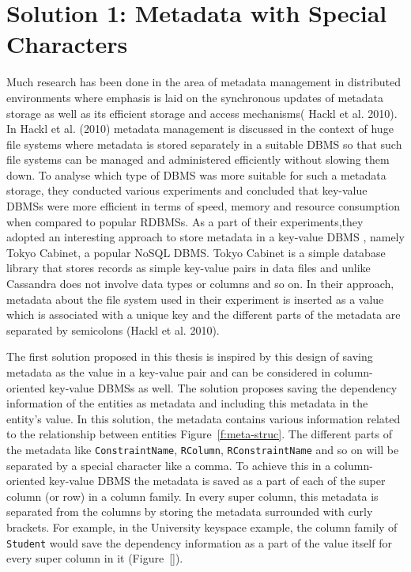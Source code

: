 \section{Solution 1:  Metadata with Special Characters}\label{s:sol1}
	Much research has been done in the area of  metadata management in distributed
	environments  where emphasis is laid on the synchronous updates of metadata
	storage as well as its efficient storage and access mechanisms(
	Hackl et al.  2010). 
	In Hackl et al.  (2010)  metadata management is discussed in the context of huge
	file systems where metadata is stored separately in a suitable \ac{DBMS} so
	that such file systems can be managed and administered efficiently without
	slowing them down.  To analyse which type of \ac{DBMS} was more suitable for such a
	metadata storage, they conducted various experiments and concluded that
	key-value \acp{DBMS} were more efficient in terms of speed, memory and resource
	consumption when compared to popular \acp{RDBMS}.  As a part of their
	experiments,they adopted an interesting approach to store metadata in a
	key-value \ac{DBMS} , namely Tokyo Cabinet, a popular \ac{NoSQL} \ac{DBMS}. Tokyo
	Cabinet is a simple database library that stores records as simple key-value
	pairs in data files and unlike Cassandra does not involve data types or columns
	and so on.  In their approach, metadata about the file system used in their
	experiment is inserted as a value which is associated with a unique key and the
	different parts of the metadata are separated by semicolons (Hackl et al.  2010). 
	
	The first solution proposed in this thesis is inspired by this design of saving
	metadata as the value in a key-value pair and can be considered in
	column-oriented key-value \acp{DBMS} as well. 
	The solution proposes saving the dependency information of the entities as
	metadata and including this metadata in the entity's value.  In this solution,
	the metadata contains  various information related to the relationship between
	entities Figure~\ref{f:meta-struc}.  The  different parts of the metadata like
	\texttt{ConstraintName}, \texttt{RColumn}, \texttt{RConstraintName} and so on
	will be separated by a special character like a comma. 
	To achieve this in a column-oriented key-value \ac{DBMS} the metadata is saved
	as a part of each of the super column (or row) in a column family. 
	In every super column, this metadata is separated from the columns
	 by storing the metadata surrounded with curly brackets. For example, in the
	 University keyspace example, the column family of \texttt{Student} would save
	 the dependency information as a part of the value itself for every  super
	 column in it (Figure~\ref{}). 
	
